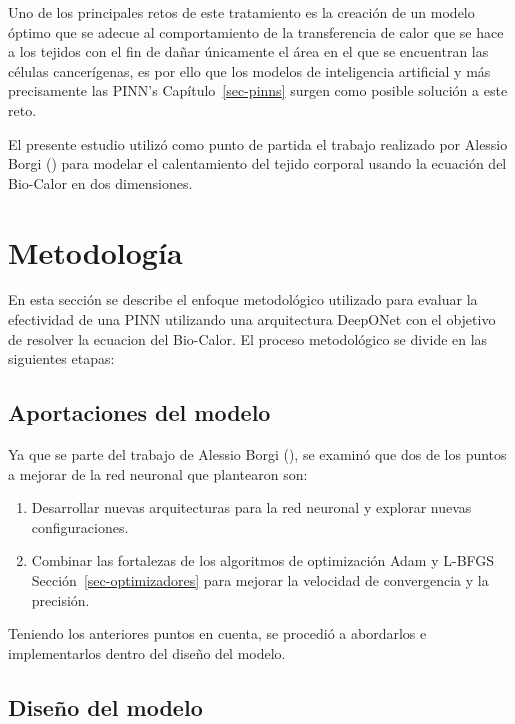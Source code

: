 \documentclass[
  spanish,
  us-letterpaper,
]{scrreprt}
\providecommand{\tightlist}{%
  \setlength{\itemsep}{0pt}\setlength{\parskip}{0pt}}
\theoremstyle{plain}
\theoremstyle{definition}
\theoremstyle{remark}
\begin{document}
Uno de los principales retos de este tratamiento es la creación de un
modelo óptimo que se adecue al comportamiento de la transferencia de
calor que se hace a los tejidos con el fin de dañar únicamente el área
en el que se encuentran las células cancerígenas, es por ello que los
modelos de inteligencia artificial y más precisamente las PINN's
Capítulo~\ref{sec-pinns} surgen como posible solución a este reto.

El presente estudio utilizó como punto de partida el trabajo realizado
por Alessio Borgi () para modelar el
calentamiento del tejido corporal usando la ecuación del Bio-Calor en
dos dimensiones.

\chapter{Metodología}\label{metodologuxeda}

En esta sección se describe el enfoque metodológico utilizado para
evaluar la efectividad de una PINN utilizando una arquitectura DeepONet
con el objetivo de resolver la ecuacion del Bio-Calor. El proceso
metodológico se divide en las siguientes etapas:

\section{Aportaciones del modelo}\label{aportaciones-del-modelo}

Ya que se parte del trabajo de Alessio Borgi
(), se examinó que dos de los puntos a
mejorar de la red neuronal que plantearon son:

\begin{enumerate}
\def\labelenumi{\arabic{enumi}.}
\tightlist
\item
  Desarrollar nuevas arquitecturas para la red neuronal y explorar
  nuevas configuraciones.
\item
  Combinar las fortalezas de los algoritmos de optimización Adam y
  L-BFGS Sección~\ref{sec-optimizadores} para mejorar la velocidad de
  convergencia y la precisión.
\end{enumerate}

Teniendo los anteriores puntos en cuenta, se procedió a abordarlos e
implementarlos dentro del diseño del modelo.

\section{Diseño del modelo}\label{diseuxf1o-del-modelo}
\end{document}
